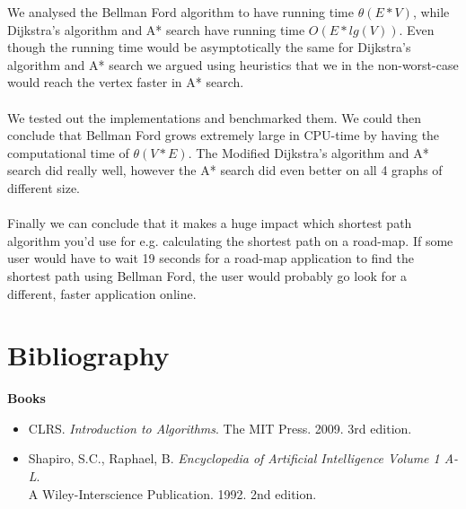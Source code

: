\documentclass[11pt]{article}
\begin{document}
\noindent We analysed the Bellman Ford algorithm to have running time $\theta(E*V)$, while Dijkstra's algorithm and A* search have running time $O(E*lg(V))$. Even though the running time would be asymptotically the same for Dijkstra's algorithm and A* search we argued using heuristics that we in the non-worst-case would reach the vertex faster in A* search.\\\\
We tested out the implementations and benchmarked them. We could then conclude that Bellman Ford grows extremely large in CPU-time by having the computational time of $\theta(V*E)$. The Modified Dijkstra's algorithm and A* search did really well, however the A* search did even better on all 4 graphs of different size.\\\\
Finally we can conclude that it makes a huge impact which shortest path algorithm you'd use for e.g. calculating the shortest path on a road-map. If some user would have to wait 19 seconds for a road-map application to find the shortest path using Bellman Ford, the user would probably go look for a different, faster application online.

\section{Bibliography}
\noindent \textbf{Books}
\begin{itemize}
\item CLRS. \textit{Introduction to Algorithms}. The MIT Press. 2009. 3rd edition.
\item Shapiro, S.C., Raphael, B. \textit{Encyclopedia of Artificial Intelligence Volume 1 A-L}.\\A Wiley-Interscience Publication. 1992. 2nd edition.
\end{itemize}
\end{document}
